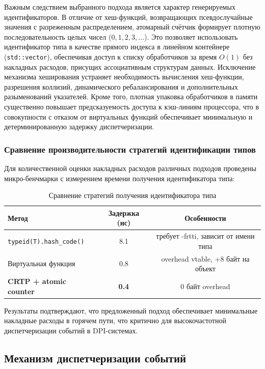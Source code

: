 Важным следствием выбранного подхода является характер генерируемых идентификаторов.
В отличие от хеш-функций, возвращающих псевдослучайные значения с разреженным распределением, атомарный счётчик формирует плотную последовательность целых чисел ($0, 1, 2, 3, \dots$).
Это позволяет использовать идентификатор типа в качестве прямого индекса в линейном контейнере (\texttt{std::vector}), обеспечивая доступ к списку обработчиков за время $O(1)$ без накладных расходов, присущих ассоциативным структурам данных.
Исключение механизма хеширования устраняет необходимость вычисления хеш-функции, разрешения коллизий, динамического ребалансирования и дополнительных разыменований указателей.
Кроме того, плотная упаковка обработчиков в памяти существенно повышает предсказуемость доступа к кэш-линиям процессора, что в совокупности с отказом от виртуальных функций обеспечивает минимальную и детерминированную задержку диспетчеризации.

\subsubsection{Сравнение производительности стратегий идентификации типов}

Для количественной оценки накладных расходов различных подходов проведены микро-бенчмарки с измерением времени получения идентификатора типа:

\begin{table}[H]
\centering
\caption{Сравнение стратегий получения идентификатора типа}
\label{tab:type_id_comparison}
\begin{tabular}{lcc}
\toprule
\textbf{Метод} & \textbf{Задержка (нс)} & \textbf{Особенности} \\
\midrule
\texttt{typeid(T).hash\_code()} & 8.1 & требует -frtti, зависит от имени типа \\
Виртуальная функция & 0.8 & overhead vtable, +8 байт на объект \\
\textbf{CRTP + atomic counter} & \textbf{0.4} & 0 байт overhead \\
\bottomrule
\end{tabular}
\end{table}

Результаты подтверждают, что предложенный подход обеспечивает минимальные накладные расходы в горячем пути, что критично для высокочастотной диспетчеризации событий в DPI-системах.

\subsection{Механизм диспетчеризации событий}
